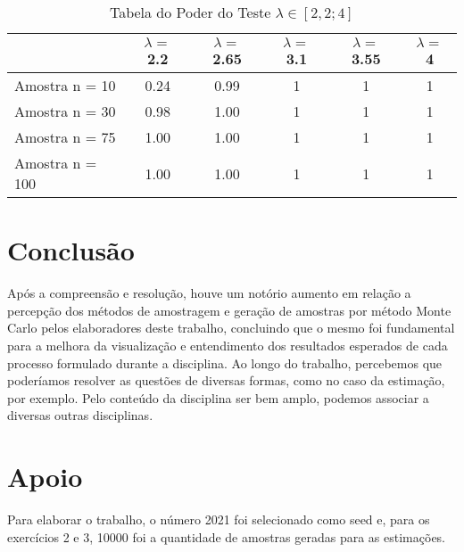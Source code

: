 \documentclass[11pt,]{article}
\begin{document}
\begin{table}[!h]

\caption{\label{tab:unnamed-chunk-9}Tabela do Poder do Teste $\lambda \in[2,2;4]$}
\centering
\begin{tabular}[t]{lccccc}
\toprule
  & $\lambda =$ 2.2 & $\lambda =$ 2.65 & $\lambda =$ 3.1 & $\lambda =$ 3.55 & $\lambda =$ 4\\
\midrule
Amostra n = 10 & 0.24 & 0.99 & 1 & 1 & 1\\
Amostra n = 30 & 0.98 & 1.00 & 1 & 1 & 1\\
Amostra n = 75 & 1.00 & 1.00 & 1 & 1 & 1\\
Amostra n = 100 & 1.00 & 1.00 & 1 & 1 & 1\\
\bottomrule
\end{tabular}
\end{table}
\newpage

\hypertarget{conclusuxe3o}{%
\section{Conclusão}\label{conclusuxe3o}}

Após a compreensão e resolução, houve um notório aumento em relação a
percepção dos métodos de amostragem e geração de amostras por método
Monte Carlo pelos elaboradores deste trabalho, concluindo que o mesmo
foi fundamental para a melhora da visualização e entendimento dos
resultados esperados de cada processo formulado durante a disciplina. Ao
longo do trabalho, percebemos que poderíamos resolver as questões de
diversas formas, como no caso da estimação, por exemplo. Pelo conteúdo
da disciplina ser bem amplo, podemos associar a diversas outras
disciplinas.

\newpage

\hypertarget{apoio}{%
\section{Apoio}\label{apoio}}

Para elaborar o trabalho, o número 2021 foi selecionado como seed e,
para os exercícios 2 e 3, 10000 foi a quantidade de amostras geradas
para as estimações.
\end{document}
